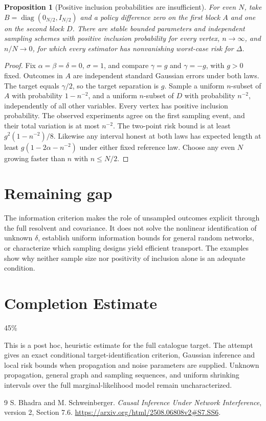 \documentclass[11pt]{article}
\newtheorem{proposition}[theorem]{Proposition}
\theoremstyle{remark}
\begin{document}
\begin{proposition}[Positive inclusion probabilities are insufficient]
For even $N$, take $B=\operatorname{diag}(0_{N/2},I_{N/2})$ and a policy difference zero on the first block $A$ and one on the second block $D$. There are stable bounded parameters and independent sampling schemes with positive inclusion probability for every vertex, $n\to\infty$, and $n/N\to0$, for which every estimator has nonvanishing worst-case risk for $\Delta$.
\end{proposition}
\begin{proof}
Fix $\alpha=\beta=\delta=0$, $\sigma=1$, and compare $\gamma=g$ and $\gamma=-g$, with $g>0$ fixed. Outcomes in $A$ are independent standard Gaussian errors under both laws. The target equals $\gamma/2$, so the target separation is $g$. Sample a uniform $n$-subset of $A$ with probability $1-n^{-2}$, and a uniform $n$-subset of $D$ with probability $n^{-2}$, independently of all other variables. Every vertex has positive inclusion probability. The observed experiments agree on the first sampling event, and their total variation is at most $n^{-2}$. The two-point risk bound is at least $g^2(1-n^{-2})/8$. Likewise any interval honest at both laws has expected length at least $g(1-2\alpha-n^{-2})$ under either fixed reference law. Choose any even $N$ growing faster than $n$ with $n\le N/2$.
\end{proof}

\section*{Remaining gap}
The information criterion makes the role of unsampled outcomes explicit through the full resolvent and covariance. It does not solve the nonlinear identification of unknown $\delta$, establish uniform information bounds for general random networks, or characterize which sampling designs yield efficient transport. The examples show why neither sample size nor positivity of inclusion alone is an adequate condition.

\section{Completion Estimate}
45\%

This is a post hoc, heuristic estimate for the full catalogue target.
The attempt gives an exact conditional target-identification criterion, Gaussian inference and local risk bounds when propagation and noise parameters are supplied. Unknown propagation, general graph and sampling sequences, and uniform shrinking intervals over the full marginal-likelihood model remain uncharacterized.

\begin{thebibliography}{9}
 S. Bhadra and M. Schweinberger. \emph{Causal Inference Under Network Interference}, version 2, Section 7.6. \url{https://arxiv.org/html/2508.06808v2#S7.SS6}.
\end{thebibliography}
\end{document}
